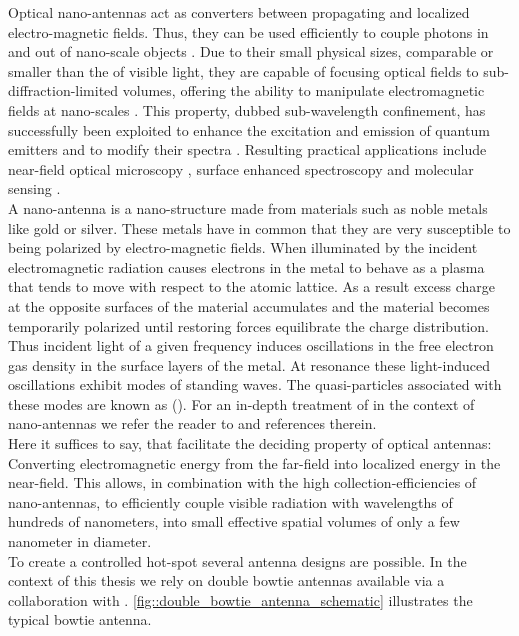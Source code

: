 		Optical nano-antennas act as converters between propagating and localized electro-magnetic fields. Thus, they can be used efficiently to couple photons in and out of nano-scale objects \cite{Curto2010}. Due to their small physical sizes, comparable or smaller than the \wl of visible light, they are capable of focusing optical fields to sub-diffraction-limited volumes, offering the ability to manipulate electromagnetic fields at nano-scales \cite{Curto2010::3, nancy::78}. This property, dubbed sub-wavelength confinement, has successfully been exploited to enhance the excitation and emission of quantum emitters \cite{Curto2010::4, Curto2010::5, Curto2010::6, Curto2010::7} and to modify their spectra \cite{Curto2010::8}. Resulting practical applications include near-field optical microscopy \cite{nancy::79}, surface enhanced spectroscopy \cite{nancy::80, nancy::81} and molecular sensing \cite{nancy::82}.
		\\
		A nano-antenna is a nano-structure made from materials such as noble metals like gold or silver. These metals have in common that they are very susceptible to being polarized by electro-magnetic fields. When illuminated by the incident electromagnetic radiation causes electrons in the metal to behave as a plasma that tends to move with respect to the atomic lattice. As a result excess charge at the opposite surfaces of the material accumulates and the material becomes temporarily polarized until restoring forces equilibrate the charge distribution.
		\\
		Thus incident light of a given frequency induces oscillations in the free electron gas density in the surface layers of the metal. At resonance these light-induced oscillations exhibit modes of standing waves. The quasi-particles associated with these modes are known as \lsps (\LSPs).
		For an in-depth treatment of \LSPs in the context of nano-antennas we refer the reader to \cite{rahbany2016towards} and references therein.
		\\
		Here it suffices to say, that \LSPs facilitate the deciding property of optical antennas: Converting electromagnetic energy from the far-field into localized energy in the near-field. This allows, in combination with the high collection-efficiencies of nano-antennas, to efficiently couple visible radiation with wavelengths of hundreds of nanometers, into small effective spatial volumes of only a few nanometer in diameter.
		\\
		To create a controlled hot-spot several antenna designs are possible. In the context of this thesis we rely on double bowtie antennas available via a collaboration with \nancy. \autoref{fig::double_bowtie_antenna_schematic} illustrates the typical bowtie antenna.

